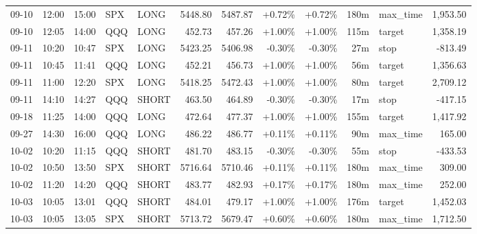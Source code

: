 \documentclass[11pt,a4paper]{article}
\begin{document}
\begin{center}
\begin{longtable}{>{\color{txtmain}}l l l l l r r r r r >{\color{txtmain}}l r}
09-10 & 12:00 & 15:00 & SPX & LONG & 5448.80 & 5487.87 & \textcolor{wingreen}{+0.72\%} & \textcolor{wingreen}{+0.72\%} & 180m & max\_time & \textcolor{wingreen}{1,953.50} \\
09-10 & 12:05 & 14:00 & QQQ & LONG & 452.73 & 457.26 & \textcolor{wingreen}{+1.00\%} & \textcolor{wingreen}{+1.00\%} & 115m & target & \textcolor{wingreen}{1,358.19} \\
09-11 & 10:20 & 10:47 & SPX & LONG & 5423.25 & 5406.98 & \textcolor{lossred}{-0.30\%} & \textcolor{lossred}{-0.30\%} & 27m & stop & \textcolor{lossred}{-813.49} \\
09-11 & 10:45 & 11:41 & QQQ & LONG & 452.21 & 456.73 & \textcolor{wingreen}{+1.00\%} & \textcolor{wingreen}{+1.00\%} & 56m & target & \textcolor{wingreen}{1,356.63} \\
09-11 & 11:00 & 12:20 & SPX & LONG & 5418.25 & 5472.43 & \textcolor{wingreen}{+1.00\%} & \textcolor{wingreen}{+1.00\%} & 80m & target & \textcolor{wingreen}{2,709.12} \\
09-11 & 14:10 & 14:27 & QQQ & SHORT & 463.50 & 464.89 & \textcolor{lossred}{-0.30\%} & \textcolor{lossred}{-0.30\%} & 17m & stop & \textcolor{lossred}{-417.15} \\
09-18 & 11:25 & 14:00 & QQQ & LONG & 472.64 & 477.37 & \textcolor{wingreen}{+1.00\%} & \textcolor{wingreen}{+1.00\%} & 155m & target & \textcolor{wingreen}{1,417.92} \\
09-27 & 14:30 & 16:00 & QQQ & LONG & 486.22 & 486.77 & \textcolor{wingreen}{+0.11\%} & \textcolor{wingreen}{+0.11\%} & 90m & max\_time & \textcolor{wingreen}{165.00} \\
10-02 & 10:20 & 11:15 & QQQ & SHORT & 481.70 & 483.15 & \textcolor{lossred}{-0.30\%} & \textcolor{lossred}{-0.30\%} & 55m & stop & \textcolor{lossred}{-433.53} \\
10-02 & 10:50 & 13:50 & SPX & SHORT & 5716.64 & 5710.46 & \textcolor{wingreen}{+0.11\%} & \textcolor{wingreen}{+0.11\%} & 180m & max\_time & \textcolor{wingreen}{309.00} \\
10-02 & 11:20 & 14:20 & QQQ & SHORT & 483.77 & 482.93 & \textcolor{wingreen}{+0.17\%} & \textcolor{wingreen}{+0.17\%} & 180m & max\_time & \textcolor{wingreen}{252.00} \\
10-03 & 10:05 & 13:01 & QQQ & SHORT & 484.01 & 479.17 & \textcolor{wingreen}{+1.00\%} & \textcolor{wingreen}{+1.00\%} & 176m & target & \textcolor{wingreen}{1,452.03} \\
10-03 & 10:05 & 13:05 & SPX & SHORT & 5713.72 & 5679.47 & \textcolor{wingreen}{+0.60\%} & \textcolor{wingreen}{+0.60\%} & 180m & max\_time & \textcolor{wingreen}{1,712.50} \\

\end{longtable}
\end{center}
\end{document}
